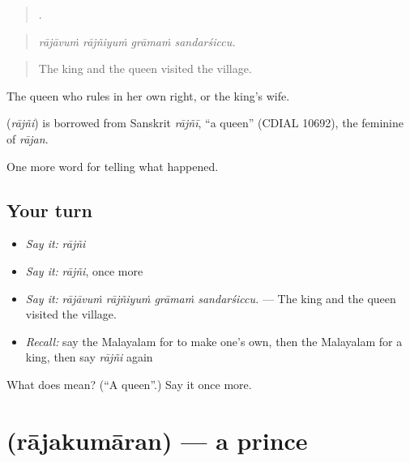 \begin{quote}
   .
\end{quote}

\begin{quote}
\emph{rājāvuṁ rājñiyuṁ grāmaṁ sandarśiccu.}
\end{quote}

\begin{quote}
The king and the queen visited the village.
\end{quote}

The queen who rules in her own right, or the king's wife.

\begin{cousinweb}
\textbf{} (\emph{rājñi}) is borrowed from Sanskrit \emph{rājñī}, \textquotedblleft{}a queen\textquotedblright{} (CDIAL 10692), the feminine of \emph{rājan}.
\end{cousinweb}

\begin{grammarlens}[title={What you've built}]
One more word for telling what happened.
\end{grammarlens}

\subsection*{Your turn}
\begin{itemize}
\raggedright
  \item \emph{Say it:} \emph{rājñi}
  \item \emph{Say it:} \emph{rājñi}, once more
  \item \emph{Say it:} \emph{rājāvuṁ rājñiyuṁ grāmaṁ sandarśiccu.} — The king and the queen visited the village.
  \item \emph{Recall:} say the Malayalam for to make one's own, then the Malayalam for a king, then say \emph{rājñi} again
\end{itemize}

\begin{tcolorbox}[breakable,colback=teal!4,colframe=teal!35!black,title={Before you move on}]
What does  mean? (\textquotedblleft{}A queen\textquotedblright{}.) Say it once more.
\end{tcolorbox}
\section[\texorpdfstring{\ml{രാജകുമാരൻ} (rājakumāran)}{രാജകുമാരൻ (rājakumāran)}]{ (rājakumāran) — a prince}

